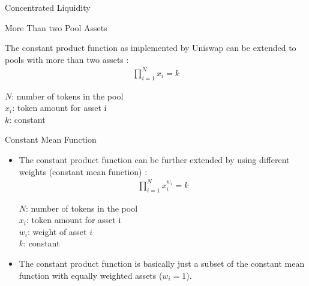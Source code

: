 \documentclass[]{beamer}
\begin{document}
\begin{frame}{Concentrated Liquidity}
	\begin{figure}[h!]
		\begin{center}
			
		\end{center}
	\end{figure}	
\end{frame}


\begin{frame}{More Than two Pool Assets}

The constant product function as implemented by Uniswap can be extended to pools with more than two assets \cite{BAL}:
		\begin{align*}
			\prod_{i=1}^N x_i= k
		\end{align*}
		
$N$: number of tokens in the pool\\
$x_i$: token amount for asset i\\
$k$: constant

\end{frame}


\begin{frame}{Constant Mean Function}
\begin{itemize}
	\item The constant product function can be further extended by using different weights (constant mean function) \cite{BAL}:
		\begin{align*}
			\prod_{i=1}^N x_i^{w_i}= k
		\end{align*}

		$N$: number of tokens in the pool\\
		$x_i$: token amount for asset i\\
		$w_i$: weight of asset $i$\\
		$k$: constant
		\vspace{0.5cm}
	\item The constant product function is basically just a subset of the constant mean function with equally weighted assets ($w_i = 1$).
\end{itemize}

\end{frame}
\end{document}
